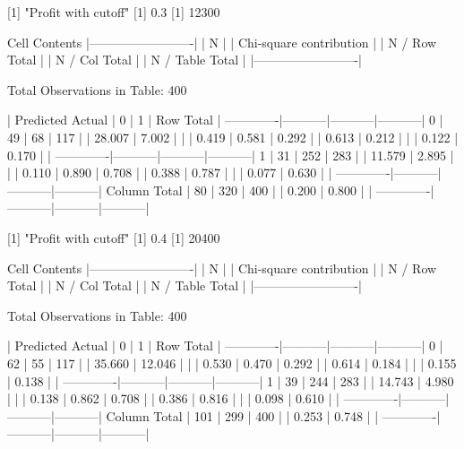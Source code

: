 \documentclass{article}
\begin{document}
\begin{Schunk}
\begin{Soutput}
 
[1] "Profit with cutoff"
[1] 0.3
[1] 12300

 
   Cell Contents
|-------------------------|
|                       N |
| Chi-square contribution |
|           N / Row Total |
|           N / Col Total |
|         N / Table Total |
|-------------------------|

 
Total Observations in Table:  400 

 
             | Predicted 
      Actual |         0 |         1 | Row Total | 
-------------|-----------|-----------|-----------|
           0 |        49 |        68 |       117 | 
             |    28.007 |     7.002 |           | 
             |     0.419 |     0.581 |     0.292 | 
             |     0.613 |     0.212 |           | 
             |     0.122 |     0.170 |           | 
-------------|-----------|-----------|-----------|
           1 |        31 |       252 |       283 | 
             |    11.579 |     2.895 |           | 
             |     0.110 |     0.890 |     0.708 | 
             |     0.388 |     0.787 |           | 
             |     0.077 |     0.630 |           | 
-------------|-----------|-----------|-----------|
Column Total |        80 |       320 |       400 | 
             |     0.200 |     0.800 |           | 
-------------|-----------|-----------|-----------|

 
[1] "Profit with cutoff"
[1] 0.4
[1] 20400

 
   Cell Contents
|-------------------------|
|                       N |
| Chi-square contribution |
|           N / Row Total |
|           N / Col Total |
|         N / Table Total |
|-------------------------|

 
Total Observations in Table:  400 

 
             | Predicted 
      Actual |         0 |         1 | Row Total | 
-------------|-----------|-----------|-----------|
           0 |        62 |        55 |       117 | 
             |    35.660 |    12.046 |           | 
             |     0.530 |     0.470 |     0.292 | 
             |     0.614 |     0.184 |           | 
             |     0.155 |     0.138 |           | 
-------------|-----------|-----------|-----------|
           1 |        39 |       244 |       283 | 
             |    14.743 |     4.980 |           | 
             |     0.138 |     0.862 |     0.708 | 
             |     0.386 |     0.816 |           | 
             |     0.098 |     0.610 |           | 
-------------|-----------|-----------|-----------|
Column Total |       101 |       299 |       400 | 
             |     0.253 |     0.748 |           | 
-------------|-----------|-----------|-----------|


\end{Soutput}
\end{Schunk}
\end{document}
